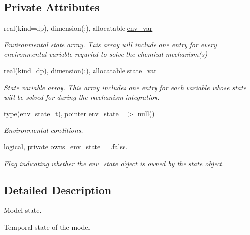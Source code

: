 \subsection*{Private Attributes}
\begin{DoxyCompactItemize}
\item 
real(kind=dp), dimension(\+:), allocatable \mbox{\hyperlink{structpmc__phlex__state_1_1phlex__state__t_afabdbb41ae2bcb87f8dcf4fec7bf6811}{env\+\_\+var}}
\begin{DoxyCompactList}\small\item\em Environmental state array. This array will include one entry for every environmental variable requried to solve the chemical mechanism(s) \end{DoxyCompactList}\item 
real(kind=dp), dimension(\+:), allocatable \mbox{\hyperlink{structpmc__phlex__state_1_1phlex__state__t_a78835cb552d483ebbfc7a6bc6f756918}{state\+\_\+var}}
\begin{DoxyCompactList}\small\item\em State variable array. This array includes one entry for each variable whose state will be solved for during the mechanism integration. \end{DoxyCompactList}\item 
type(\mbox{\hyperlink{structpmc__env__state_1_1env__state__t}{env\+\_\+state\+\_\+t}}), pointer \mbox{\hyperlink{structpmc__phlex__state_1_1phlex__state__t_a4ac7b2d748d2da9249ced5e88637c302}{env\+\_\+state}} =$>$ null()
\begin{DoxyCompactList}\small\item\em Environmental conditions. \end{DoxyCompactList}\item 
logical, private \mbox{\hyperlink{structpmc__phlex__state_1_1phlex__state__t_a0ca66efd1f34ad83178d2b75d418c5ef}{owns\+\_\+env\+\_\+state}} = .false.
\begin{DoxyCompactList}\small\item\em Flag indicating whether the env\+\_\+state object is owned by the state object. \end{DoxyCompactList}\end{DoxyCompactItemize}


\subsection{Detailed Description}
Model state. 

Temporal state of the model 

